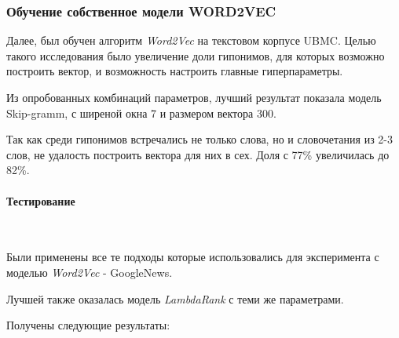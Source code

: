 \subsubsection{Обучение собственное модели WORD2VEC}

Далее, был обучен алгоритм \textit{Word2Vec} на текстовом корпусе UBMC. Целью такого
исследования было увеличение доли гипонимов, для которых возможно построить вектор,
и возможность настроить главные гиперпараметры.

Из опробованных комбинаций параметров, лучший результат показала модель Skip-gramm,
с ширеной окна 7 и размером вектора 300.

Так как среди гипонимов встречались не только слова, но и словочетания из 2-3 слов, не
удалость построить вектора для них в сех. Доля с 77\% увеличилась до 82\%.

\paragraph{Тестирование}
~\
~\

Были применены все те подходы которые использовались для эксперимента с моделью
\textit{Word2Vec} - GoogleNews.

Лучшей также оказалась модель \textit{LambdaRank} с теми же параметрами.

Получены следующие результаты:

